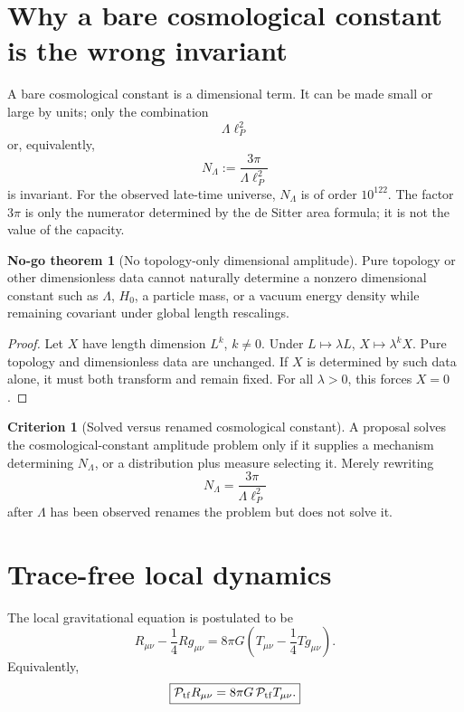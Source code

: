 \documentclass[aps,prd,reprint,nofootinbib,superscriptaddress,floatfix]{revtex4-2}
\numberwithin{equation}{section}
\theoremstyle{definition}
\newtheorem{criterion}{Criterion}[section]
\newtheorem{nogotheorem}{No-go theorem}[section]
\theoremstyle{plain}
\newcommand{\Ptr}{\mathcal P_{\rm tf}}
\begin{document}
\section{Why a bare cosmological constant is the wrong invariant}

A bare cosmological constant is a dimensional term.  It can be made small or large by units; only the combination
\begin{equation}
\boxed{
\Lambda\ell_P^2
}
\end{equation}
or, equivalently,
\begin{equation}
\boxed{
N_\Lambda:=\frac{3\pi}{\Lambda\ell_P^2}
}
\end{equation}
is invariant.  For the observed late-time universe, \(N_\Lambda\) is of order \(10^{122}\).  The factor \(3\pi\) is only the numerator determined by the de Sitter area formula; it is not the value of the capacity.

\begin{nogotheorem}[No topology-only dimensional amplitude]\label{nogo:topology-amplitude}
Pure topology or other dimensionless data cannot naturally determine a nonzero dimensional constant such as \(\Lambda\), \(H_0\), a particle mass, or a vacuum energy density while remaining covariant under global length rescalings.
\end{nogotheorem}

\begin{proof}
Let \(X\) have length dimension \(L^k\), \(k\ne0\).  Under \(L\mapsto\lambda L\), \(X\mapsto\lambda^kX\).  Pure topology and dimensionless data are unchanged.  If \(X\) is determined by such data alone, it must both transform and remain fixed.  For all \(\lambda>0\), this forces \(X=0\).
\end{proof}

\begin{criterion}[Solved versus renamed cosmological constant]
A proposal solves the cosmological-constant amplitude problem only if it supplies a mechanism determining \(N_\Lambda\), or a distribution plus measure selecting it.  Merely rewriting
\[
N_\Lambda=\frac{3\pi}{\Lambda\ell_P^2}
\]
after \(\Lambda\) has been observed renames the problem but does not solve it.
\end{criterion}

\section{Trace-free local dynamics}

The local gravitational equation is postulated to be
\begin{equation}
\boxed{
R_{\mu\nu}-\frac14Rg_{\mu\nu}
=
8\pi G\left(T_{\mu\nu}-\frac14Tg_{\mu\nu}\right).
}
\label{eq:tracefree}
\end{equation}
Equivalently,
\begin{equation}
\boxed{
\Ptr R_{\mu\nu}=8\pi G\,\Ptr T_{\mu\nu}.
}
\end{equation}
\end{document}
